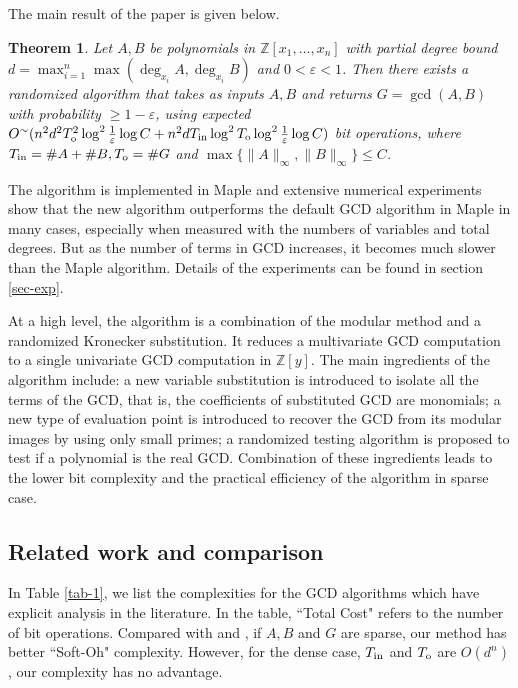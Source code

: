 \documentclass[final,20pt]{elsarticle}
\newtheorem{theorem}{Theorem}[section]
\def\Z{{\mathbb Z}}
\def\inp{{\rm{in}}}
\def\out{{\rm{o}}}
\begin{document}
The main result of the paper is given below.
\begin{theorem}
Let $A,B$ be polynomials  in $\Z[x_1,\dots,x_n]$ with partial degree bound $d=\max_{i=1}^n \max(\deg_{x_i}A,\deg_{x_i}B)$ and $0<\varepsilon<1$.
Then there exists a randomized algorithm that takes as inputs $A,B$ and
returns $G=\gcd(A,B)$ with probability $\geq 1-\varepsilon$, using expected $O^\sim(n^2d^2T_{\out}^2\log^2 \frac{1}{\varepsilon}\log C+n^2dT_{\inp}\log^2 T_{\out}\log^2\frac{1}{\varepsilon}\log C)$ bit operations, where $T_{\inp}=\#A+\#B,T_{\out}=\#G$ and $\max\{\|A\|_{\infty},\|B\|_{\infty}\}\leq C$.
\end{theorem}

The algorithm is implemented in Maple and extensive numerical experiments
show that the new algorithm outperforms the default GCD algorithm in Maple in many cases,
especially when measured with the numbers of variables and total degrees. But as the number of terms in GCD increases, it becomes much slower than the Maple algorithm.
%
Details of the experiments can be found in section \ref{sec-exp}.


%

At  a high level, the algorithm is a combination of the modular method and a randomized Kronecker substitution.   It reduces a multivariate GCD computation to a single univariate GCD computation in $\Z[y]$.
%
The main ingredients of the algorithm include:
a new variable substitution is introduced to isolate all the terms of the GCD, that is, the coefficients of substituted GCD are monomials;
%
a new type of evaluation point is introduced to recover the GCD from its modular images
by using only small primes; a randomized testing algorithm is proposed to test if a polynomial is the real GCD.
%
Combination of these ingredients leads to the lower bit complexity
and the practical efficiency of the algorithm in sparse case.

\subsection{Related work and comparison}

In Table \ref{tab-1}, we list the complexities for the GCD algorithms which have explicit analysis in the literature.
%
In the table, ``Total Cost" refers to the number of bit operations.
%
%
Compared with \cite{BrownT71} and \cite{Collins67}, if $A,B$ and $G$ are sparse, our method has better ``Soft-Oh" complexity. However, for the dense case, $T_{\inp}$ and $T_{\out}$ are $O(d^n)$, our complexity has no advantage.
\end{document}
